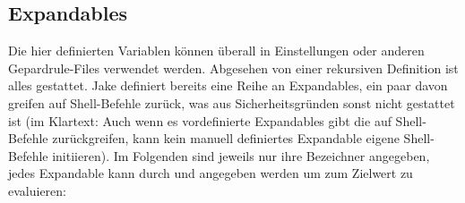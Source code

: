 \subsection{Expandables}
Die hier definierten Variablen können überall in Einstellungen oder anderen Gepardrule-Files verwendet werden. Abgesehen von einer rekursiven Definition ist alles gestattet. Jake definiert bereits eine Reihe an Expandables, ein paar davon greifen auf Shell-Befehle zurück, was aus Sicherheitsgründen sonst nicht gestattet ist (im Klartext: Auch wenn es vordefinierte Expandables gibt die auf Shell-Befehle zurückgreifen, kann kein manuell definiertes Expandable eigene Shell-Befehle initiieren). Im Folgenden sind jeweils nur ihre Bezeichner angegeben, jedes Expandable kann durch \T{\$[<Name>]} und  angegeben werden um zum Zielwert zu evaluieren:
